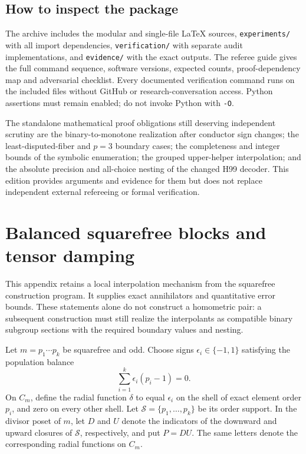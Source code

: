 \documentclass[11pt]{article}
\numberwithin{equation}{section}
\theoremstyle{definition}
\theoremstyle{remark}
\begin{document}
\subsection{How to inspect the package}
The archive includes the modular and single-file \LaTeX{} sources,
\texttt{experiments/} with all import dependencies,
\texttt{verification/} with separate audit implementations, and
\texttt{evidence/} with the exact outputs. The referee guide gives the full
command sequence, software versions, expected counts, proof-dependency map
and adversarial checklist. Every documented verification command runs on
the included files without GitHub or research-conversation access.
Python assertions must remain enabled; do not invoke Python with
\texttt{-O}.

The standalone mathematical proof obligations still deserving independent
scrutiny are the binary-to-monotone realization after conductor sign changes;
the least-disputed-fiber and $p=3$ boundary cases; the completeness and integer
bounds of the symbolic enumeration; the grouped upper-helper interpolation;
and the absolute precision and all-choice nesting of the changed H99 decoder.
This edition provides arguments and evidence for them but does not replace
independent external refereeing or formal verification.



\section{Balanced squarefree blocks and tensor damping}
\label{v2:app:squarefree-damping}

This appendix retains a local interpolation mechanism from the squarefree
construction program.  It supplies exact annihilators and quantitative error
bounds.  These statements alone do not construct a homometric pair: a
subsequent construction must still realize the interpolants as compatible
binary subgroup sections with the required boundary values and nesting.

Let $m=p_1\cdots p_k$ be squarefree and odd.  Choose signs
$\epsilon_i\in\{-1,1\}$ satisfying the population balance
\begin{equation}\label{v2:eq:balanced-singletons}
 \sum_{i=1}^k\epsilon_i(p_i-1)=0.
\end{equation}
On $C_m$, define the radial function $\delta$ to equal $\epsilon_i$ on
the shell of exact element order $p_i$, and zero on every other shell.
Let $\mathcal S=\{p_1,\ldots,p_k\}$ be its order support.  In the divisor
poset of $m$, let $D$ and $U$ denote the indicators of the downward and
upward closures of $\mathcal S$, respectively, and put $P=DU$.
The same letters denote the corresponding radial functions on $C_m$.
\end{document}
